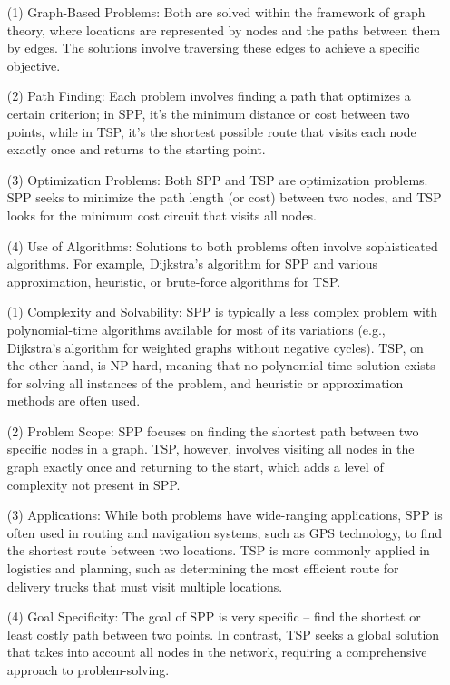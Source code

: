 \begin{enumerate}[leftmargin=2em]
\item[(1)] Graph-Based Problems: Both are solved within the framework of graph theory, where locations are represented by nodes and the paths between them by edges. The solutions involve traversing these edges to achieve a specific objective.

\item[(2)] Path Finding: Each problem involves finding a path that optimizes a certain criterion; in SPP, it's the minimum distance or cost between two points, while in TSP, it's the shortest possible route that visits each node exactly once and returns to the starting point.

\item[(3)] Optimization Problems: Both SPP and TSP are optimization problems. SPP seeks to minimize the path length (or cost) between two nodes, and TSP looks for the minimum cost circuit that visits all nodes.

\item[(4)] Use of Algorithms: Solutions to both problems often involve sophisticated algorithms. For example, Dijkstra's algorithm for SPP and various approximation, heuristic, or brute-force algorithms for TSP.

\end{enumerate}


\begin{enumerate}[leftmargin=2em]

\item[(1)] Complexity and Solvability: SPP is typically a less complex problem with polynomial-time algorithms available for most of its variations (e.g., Dijkstra's algorithm for weighted graphs without negative cycles). TSP, on the other hand, is NP-hard, meaning that no polynomial-time solution exists for solving all instances of the problem, and heuristic or approximation methods are often used.

\item[(2)] Problem Scope: SPP focuses on finding the shortest path between two specific nodes in a graph. TSP, however, involves visiting all nodes in the graph exactly once and returning to the start, which adds a level of complexity not present in SPP.

\item[(3)] Applications: While both problems have wide-ranging applications, SPP is often used in routing and navigation systems, such as GPS technology, to find the shortest route between two locations. TSP is more commonly applied in logistics and planning, such as determining the most efficient route for delivery trucks that must visit multiple locations.

\item[(4)] Goal Specificity: The goal of SPP is very specific – find the shortest or least costly path between two points. In contrast, TSP seeks a global solution that takes into account all nodes in the network, requiring a comprehensive approach to problem-solving.

\end{enumerate}

